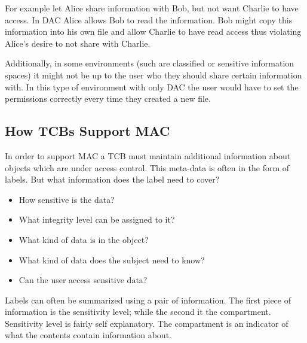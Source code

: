     For example let Alice share information with Bob, but not want Charlie to have access.
    In DAC Alice allows Bob to read the information.
    Bob might copy this information into his own file and allow Charlie to have read access thus violating
      Alice's desire to not share with Charlie.

    Additionally, in some environments (such are classified or sensitive information spaces) it might not
      be up to the user who they should share certain information with. 
    In this type of environment with only DAC the user would have to set the permissions correctly
      every time they created a new file.
  
  \subsection{How TCBs Support MAC}
  \label{ssec:how_tcb_support_mac}

    In order to support MAC a TCB must maintain additional information about objects which are under access control.
    This meta-data is often in the form of labels.
    But what information does the label need to cover?

    \begin{itemize}
      \item How sensitive is the data?
      \item What integrity level can be assigned to it?
      \item What kind of data is in the object?
      \item What kind of data does the subject need to know?
      \item Can the user access sensitive data?
    \end{itemize}

    Labels can often be summarized using a pair of information.
    The first piece of information is the sensitivity level; while the second it the compartment.
    Sensitivity level is fairly self explanatory.
    The compartment is an indicator of what the contents contain information about. 
    